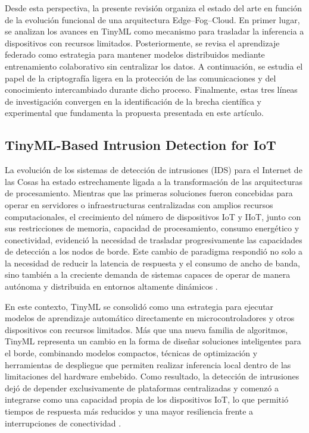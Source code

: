 \documentclass[journal,article,submit,moreauthors]{Definitions/mdpi}
\begin{document}
Desde esta perspectiva, la presente revisión organiza el estado del arte en función de la evolución funcional de una arquitectura Edge--Fog--Cloud. En primer lugar, se analizan los avances en TinyML como mecanismo para trasladar la inferencia a dispositivos con recursos limitados. Posteriormente, se revisa el aprendizaje federado como estrategia para mantener modelos distribuidos mediante entrenamiento colaborativo sin centralizar los datos. A continuación, se estudia el papel de la criptografía ligera en la protección de las comunicaciones y del conocimiento intercambiado durante dicho proceso. Finalmente, estas tres líneas de investigación convergen en la identificación de la brecha científica y experimental que fundamenta la propuesta presentada en este artículo.

\subsection{TinyML-Based Intrusion Detection for IoT}
La evolución de los sistemas de detección de intrusiones (IDS) para el Internet de las Cosas ha estado estrechamente ligada a la transformación de las arquitecturas de procesamiento. Mientras que las primeras soluciones fueron concebidas para operar en servidores o infraestructuras centralizadas con amplios recursos computacionales, el crecimiento del número de dispositivos IoT y IIoT, junto con sus restricciones de memoria, capacidad de procesamiento, consumo energético y conectividad, evidenció la necesidad de trasladar progresivamente las capacidades de detección a los nodos de borde. Este cambio de paradigma respondió no solo a la necesidad de reducir la latencia de respuesta y el consumo de ancho de banda, sino también a la creciente demanda de sistemas capaces de operar de manera autónoma y distribuida en entornos altamente dinámicos \cite{Ni2024,Amanullah2020,Bagaa2020,SaravanaBalaji2023,Tamuka2026}.

En este contexto, TinyML se consolidó como una estrategia para ejecutar modelos de aprendizaje automático directamente en microcontroladores y otros dispositivos con recursos limitados. Más que una nueva familia de algoritmos, TinyML representa un cambio en la forma de diseñar soluciones inteligentes para el borde, combinando modelos compactos, técnicas de optimización y herramientas de despliegue que permiten realizar inferencia local dentro de las limitaciones del hardware embebido. Como resultado, la detección de intrusiones dejó de depender exclusivamente de plataformas centralizadas y comenzó a integrarse como una capacidad propia de los dispositivos IoT, lo que permitió tiempos de respuesta más reducidos y una mayor resiliencia frente a interrupciones de conectividad \cite{Tekin2023,Amuthadevi2025,Dini2024,Heydari2024}.
\end{document}

